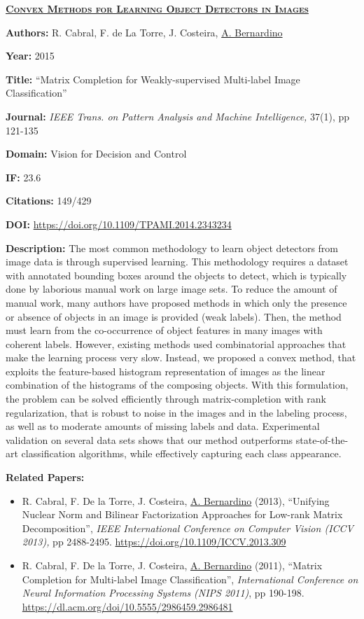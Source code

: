 \clearpage

\textbf{\textsc{\ul{Convex Methods for Learning Object Detectors in
Images}}}

\textbf{Authors:} R. Cabral, F. de La Torre, J. Costeira, \ul{A.
Bernardino}

\textbf{Year:} 2015

\textbf{Title:} ``Matrix Completion for Weakly-supervised Multi-label
Image Classification''

\textbf{Journal:} \emph{IEEE Trans. on} \emph{Pattern Analysis and
Machine Intelligence,} 37(1), pp 121-135

\textbf{Domain:} Vision for Decision and Control

\textbf{IF:} 23.6

\textbf{Citations:} 149/429

\textbf{DOI:} \url{https://doi.org/10.1109/TPAMI.2014.2343234}

\textbf{Description:} The most common methodology to learn object
detectors from image data is through supervised learning. This
methodology requires a dataset with annotated bounding boxes around the
objects to detect, which is typically done by laborious manual work on
large image sets. To reduce the amount of manual work, many authors have
proposed methods in which only the presence or absence of objects in an
image is provided (weak labels). Then, the method must learn from the
co-occurrence of object features in many images with coherent labels.
However, existing methods used combinatorial approaches that make the
learning process very slow. Instead, we proposed a convex method, that
exploits the feature-based histogram representation of images as the
linear combination of the histograms of the composing objects. With this
formulation, the problem can be solved efficiently through
matrix-completion with rank regularization, that is robust to noise in
the images and in the labeling process, as well as to moderate amounts
of missing labels and data. Experimental validation on several data sets
shows that our method outperforms state-of-the-art classification
algorithms, while effectively capturing each class appearance.

\textbf{Related Papers:}

\begin{itemize}
\item
  R. Cabral, F. De la Torre, J. Costeira, \ul{A. Bernardino} (2013),
  ``Unifying Nuclear Norm and Bilinear Factorization Approaches for
  Low-rank Matrix Decomposition'', \emph{IEEE International Conference
  on Computer Vision (ICCV 2013),} pp 2488-2495.
  \url{https://doi.org/10.1109/ICCV.2013.309}
\item
  R. Cabral, F. De la Torre, J. Costeira, \ul{A. Bernardino} (2011),
  ``Matrix Completion for Multi-label Image Classification'',
  \emph{International Conference on Neural Information Processing
  Systems} \emph{(NIPS 2011)}, pp 190-198.
  \url{https://dl.acm.org/doi/10.5555/2986459.2986481}
\end{itemize}

